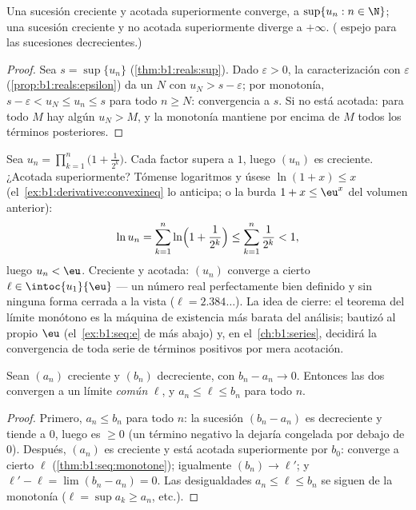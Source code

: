 \begin{theorem}\label{thm:b1:seq:monotone}
Una sucesión creciente y acotada superiormente converge, a
$\sup\{u_n : n \in \N\}$; una sucesión creciente y no acotada
superiormente diverge a $+\infty$. ( espejo para las
sucesiones decrecientes.)
\end{theorem}

\begin{proof}
Sea $s = \sup\{u_n\}$ (\cref{thm:b1:reals:sup}). Dado
$\varepsilon > 0$, la caracterización con $\varepsilon$
(\cref{prop:b1:reals:epsilon}) da un $N$ con $u_N > s - \varepsilon$;
por monotonía, $s - \varepsilon < u_N \leq u_n \leq s$ para todo
$n \geq N$: convergencia a $s$. Si no está acotada: para todo $M$ hay
algún $u_N > M$, y la monotonía mantiene por encima de $M$ todos los
términos posteriores.
\end{proof}

\begin{example}\label{ex:b1:seq:existencemachine}
Sea $u_n = \prod_{k=1}^{n} \bigl(1 + \frac{1}{2^k}\bigr)$. Cada factor
supera a $1$, luego $(u_n)$ es creciente. ¿Acotada superiormente?
Tómense logaritmos y úsese $\ln(1 + x) \leq x$
(el~\cref{ex:b1:derivative:convexineq} lo anticipa; o la burda
$1 + x \leq \eu^x$ del volumen anterior):
\[
\ln u_n = \sum_{k=1}^{n} \ln\Bigl(1 + \frac{1}{2^k}\Bigr)
\leq \sum_{k=1}^{n} \frac{1}{2^k} < 1 ,
\]
luego $u_n < \eu$. Creciente y acotada: $(u_n)$ converge a cierto
$\ell \in \intoc{u_1}{\eu}$ --- un número real perfectamente bien
definido y sin ninguna forma cerrada a la vista ($\ell = 2.384\dots$).
La idea de cierre: el teorema del límite monótono es la máquina de
existencia más barata del análisis; bautizó al propio $\eu$
(el~\cref{ex:b1:seq:e} de más abajo) y, en el~\cref{ch:b1:series},
decidirá la convergencia de toda serie de términos positivos por mera
acotación.
\end{example}

\begin{theorem}\label{thm:b1:seq:adjacent}
Sean $(a_n)$ creciente y $(b_n)$ decreciente, con $b_n - a_n \to 0$.
Entonces las dos convergen a un límite \emph{común} $\ell$, y
$a_n \leq \ell \leq b_n$ para todo $n$.
\end{theorem}

\begin{proof}
Primero, $a_n \leq b_n$ para todo $n$: la sucesión $(b_n - a_n)$ es
decreciente y tiende a $0$, luego es $\geq 0$ (un término negativo la
dejaría congelada por debajo de $0$). Después, $(a_n)$ es creciente y
está acotada superiormente por $b_0$: converge a cierto $\ell$
(\cref{thm:b1:seq:monotone}); igualmente $(b_n) \to \ell'$; y
$\ell' - \ell = \lim (b_n - a_n) = 0$. Las desigualdades
$a_n \leq \ell \leq b_n$ se siguen de la monotonía
($\ell = \sup a_k \geq a_n$, etc.).
\end{proof}

